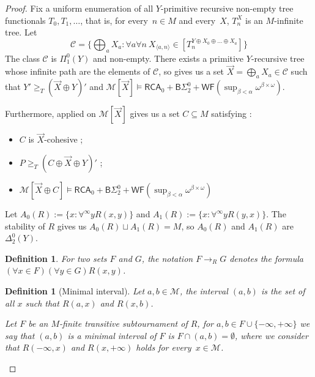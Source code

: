\documentclass{article}
\numberwithin{theorem}{section}
\newtheorem{definition}[theorem]{Definition}
\newcommand{\ludovic}[1]{\textcolor{blue}{#1}}
\newcommand{\RCA}{\mathsf{RCA}}
\newcommand{\BSig}{\mathsf{B}\Sigma^0}
\newcommand{\WF}{\mathsf{WF}}
\newcommand{\C}{\mathcal{C}}
\newcommand{\M}{\mathcal{M}}
\begin{document}
\begin{proof}

Fix a uniform enumeration of all $Y$-primitive recursive non-empty tree functionals $T_0, T_1, \dots$, 
that is, for every~$n \in M$ and every~$X$, $T_n^X$ is an $M$-infinite tree. Let
$$
\C = \{ \bigoplus_a X_a : \forall a \forall n\ X_{\langle a, n\rangle} \in [T_n^{Y \oplus X_0 \oplus \dots \oplus X_a}] \}
$$
The class $\C$ is $\Pi^0_1(Y)$ and non-empty. There exists a primitive $Y$-recursive tree whose infinite path are the elements of $\C$, so  gives us a set $\vec{X} = \bigoplus_a X_a \in \C$ such that $Y' \geq_T (\vec{X} \oplus Y)'$ and $\M[\vec{X}] \models \RCA_0 + \BSig_2 + \WF(\sup_{\beta < \alpha} \omega^{\beta \times \omega})$.


Furthermore,  applied on $\M[\vec{X}]$ gives us a set $C \subseteq M$ satisfying  :
\begin{itemize}
    \item $C$ is $\vec{X}$-cohesive ;
    \item $P \geq_T (C \oplus \vec{X} \oplus Y)'$ ;
    \item $\M[\vec{X} \oplus C] \models \RCA_0 + \BSig_2 + \WF(\sup_{\beta < \alpha} \omega^{\beta \times \omega})$
\end{itemize}

Let $A_0(R) := \{x : \forall^{\infty} y R(x,y) \}$ and $A_1(R) := \{x : \forall^{\infty} y R(y,x)\}$. The stability of $R$ gives us $A_0(R) \sqcup A_1(R) = M$, so $A_0(R)$ and $A_1(R)$ are $\Delta_2^0(Y)$.

\begin{definition}
For two sets $F$ and $G$, the notation $F \to_R G$ denotes the formula $(\forall x \in F)(\forall y \in G)R(x,y)$.     
\end{definition}

\begin{definition}[Minimal interval] 
Let $a,b \in \M$, the interval $(a,b)$ is the set of all $x$ such that $R(a,x)$ and $R(x,b)$.

Let $F$ be an $M$-finite transitive subtournament of $R$, for $a,b \in F \cup \{-\infty, +\infty\}$ we say that $(a,b)$ is a minimal interval of $F$ is $F \cap (a,b) = \emptyset$, where we consider that $R(-\infty, x)$ and $R(x, +\infty)$ holds for every~$x \in \M$.
\end{definition}


\end{proof}
\end{document}
